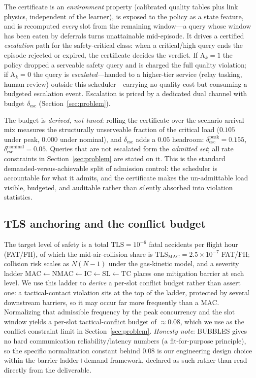 The certificate is an \emph{environment} property (calibrated quality
tables plus link physics, independent of the learner), is exposed to the
policy as a state feature, and is recomputed \emph{every} slot from the
remaining window---a query whose window has been eaten by deferrals turns
unattainable mid-episode. It drives a certified \emph{escalation} path for
the safety-critical class: when a critical/high query ends the episode
rejected or expired, the certificate decides the verdict. If
$\mathrm{A}_k=1$ the policy dropped a serveable safety query and is charged
the full quality violation; if $\mathrm{A}_k=0$ the query is
\emph{escalated}---handed to a higher-tier service (relay tasking, human
review) outside this scheduler---carrying no quality cost but consuming a
budgeted escalation event. Escalation is priced by a dedicated dual channel
with budget $\delta_{\mathrm{esc}}$ (Section~\ref{sec:problem}).

The budget is \emph{derived, not tuned}: rolling the certificate over the
scenario arrival mix measures the structurally unserveable fraction of the
critical load ($0.105$ under peak, $0.000$ under nominal), and
$\delta_{\mathrm{esc}}$ adds a $0.05$ headroom:
$\delta_{\mathrm{esc}}^{\mathrm{peak}}=0.155$,
$\delta_{\mathrm{esc}}^{\mathrm{nominal}}=0.05$. Queries that are not
escalated form the \emph{admitted set}; all rate constraints in
Section~\ref{sec:problem} are stated on it. This is the standard
demanded-versus-achievable split of admission control: the scheduler is
accountable for what it admits, and the certificate makes the
un-admittable load visible, budgeted, and auditable rather than silently
absorbed into violation statistics.

\subsection{TLS anchoring and the conflict budget}
The target level of safety is a total $\mathrm{TLS}=10^{-6}$ fatal
accidents per flight hour (FAT/FH), of which the mid-air-collision share is
$\mathrm{TLS}_{\mathrm{MAC}}=2.5\times10^{-7}$ FAT/FH; collision risk scales
as $N(N{-}1)$ under the gas-kinetic model, and a severity ladder
MAC$\leftarrow$NMAC$\leftarrow$IC$\leftarrow$SL$\leftarrow$TC places one
mitigation barrier at each level. We use this ladder to \emph{derive} a
per-slot conflict budget rather than assert one: a tactical-contact
violation sits at the top of the ladder, protected by several downstream
barriers, so it may occur far more frequently than a MAC. Normalizing that
admissible frequency by the peak concurrency and the slot window yields a
per-slot tactical-conflict budget of $\approx\!0.08$, which we use as the
conflict constraint limit in Section~\ref{sec:problem}.
\emph{Honesty note}: BUBBLES gives no hard communication
reliability/latency numbers (a fit-for-purpose principle), so the specific
normalization constant behind $0.08$ is our engineering design choice
within the barrier-ladder$+$demand framework, declared as such rather than
read directly from the deliverable.

